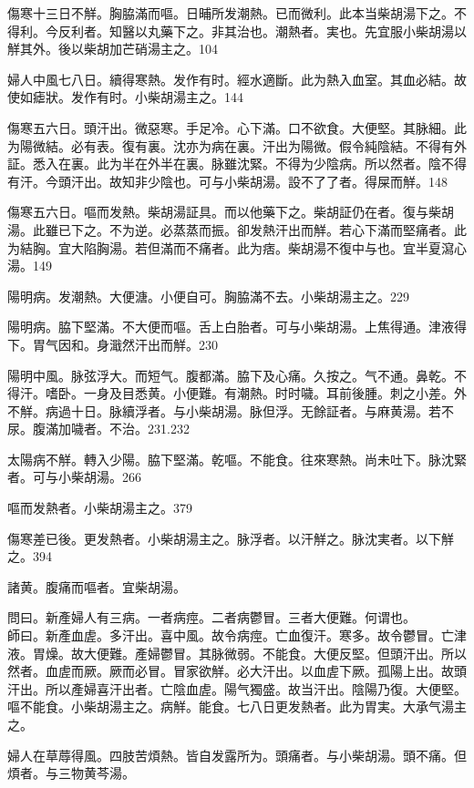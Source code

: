 \documentclass[12pt,twoside,UTF8,b5paper]{ctexbook}
\begin{document}
傷寒十三日不觧。胸脇滿而嘔。日晡所发潮熱{。已}而微利。此本当柴胡湯下之。不得利。今反利者。知醫以丸藥下之。非其治也。潮熱者。実也。先宜服小柴胡湯以觧其外。後以柴胡加芒硝湯主之。104

婦人中風七八日。續得寒熱。发作有时。經水適斷。此为熱入血室。其血必結。故使如瘧狀。发作有时。小柴胡湯主之。144

傷寒五六日。頭汗出。微惡寒。手足冷。心下滿。口不欲食。大便堅。其脉細。此为陽微結。必有表。復有裏。沈亦为病在裏。汗出为陽微。假令純陰結。不得有外証。悉入在裏。此为半在外半在裏。脉雖沈緊。不得为少陰病。所以然者。陰不得有汗。今頭汗出。故知非少陰也。可与{小}柴胡湯。設不了了者。得屎而觧。148

傷寒五六日。嘔而发熱。柴胡湯証具。而以他藥下之。柴胡証仍在者。復与柴胡湯。此雖已下之。不为逆。必蒸蒸而振。卻发熱汗出而觧。若心下滿而堅痛者。此为結胸。宜大陷胸湯。若但滿而不痛者。此为痞。柴胡{湯}不復中与也。宜半夏瀉心湯。149

陽明病。发潮熱。大便溏。小便自可。胸脇滿不去。小柴胡湯主之。229

陽明病。脇下堅滿。不大便而嘔。舌上白胎者。可与小柴胡湯。上焦得通。津液得下。胃气因和。身濈然汗出而觧。230

陽明中風。脉弦浮大。而短气。腹都滿。脇下及心痛。久按之。气不通。鼻乾。不得汗。嗜卧。一身及目悉黄。小便難。有潮熱。时时噦。耳前後腫。刺之小差。外不觧。病過十日。脉續浮者。与{小}柴胡湯。脉但浮。无餘証者。与麻黄湯。若不尿。腹滿加噦者。不治。231.232

太陽病不觧。轉入少陽。脇下堅滿。乾嘔。不能食。往來寒熱。尚未吐下。脉沈緊者。可与小柴胡湯。266

嘔而发熱者。小柴胡湯主之。379

傷寒差已後。更发熱者。小柴胡湯主之。脉浮者。以汗觧之。脉沈実者。以下觧之。394

諸黄。腹痛而嘔者。宜柴胡湯。

問曰。新產婦人有三病。一者病痙。二者病鬱冒。三者大便難。何谓也。\\
師曰。新產血虗。多汗出。喜中風。故令病痙。亡血復汗。寒多。故令鬱冒。亡津液。胃燥。故大便難。產婦鬱冒。其脉微弱。不能食。大便反堅。但頭汗出。所以然者。血虗而厥。厥而必冒。冒家欲觧。必大汗出。以血虗下厥。孤陽上出。故頭汗出。所以產婦喜汗出者。亡陰血虗。陽气獨盛。故当汗出。陰陽乃復。大便堅。嘔不能食。小柴胡湯主之。病觧。能食。七八日更发熱者。此为胃実。大承气湯主之。

婦人在草蓐得風。四肢苦煩熱。皆自发露所为。頭痛者。与小柴胡湯。頭不痛。但煩者。与三物黄芩湯。
\end{document}
